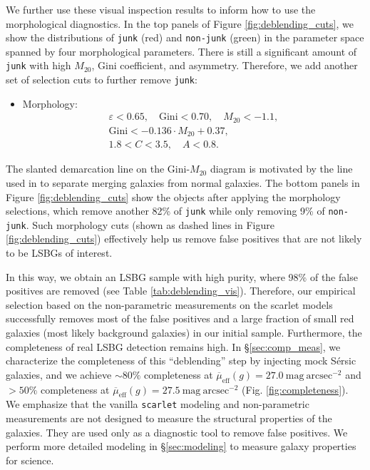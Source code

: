 \documentclass[twocolumn,astrosymb,twocolappendix]{aastex631}
\newcommand{\sbunit}{\mathrm{mag\ arcsec}^{-2}}
\newcommand{\sbeff}{\overline{\mu}_{\mathrm{eff}}(g)}
\newcommand{\code}[1]{\texttt{#1}}
\newcommand{\sersic}{S\'ersic}
\begin{document}
\begin{CJK*}{UTF8}{gbsn}
We further use these visual inspection results to inform how to use the morphological diagnostics. In the top panels of Figure \ref{fig:deblending_cuts}, we show the distributions of \code{junk} (red) and \code{non-junk} (green) in the parameter space spanned by four morphological parameters. There is still a significant amount of \code{junk} with high $M_{20}$, Gini coefficient, and asymmetry. Therefore, we add another set of selection cuts to further remove \code{junk}:
\begin{itemize}
    \item Morphology: 
    \begin{gather*}
        \varepsilon < 0.65,\quad \mathrm{Gini} < 0.70,\quad M_{20} < -1.1,\\
        \mathrm{Gini} < -0.136\cdot M_{20} + 0.37,\\
        1.8 < C < 3.5,\quad A < 0.8.
    \end{gather*}
\end{itemize}
The slanted demarcation line on the Gini-$M_{20}$ diagram is motivated by the line used in \citet{Lotz2008} to separate merging galaxies from normal galaxies. The bottom panels in Figure \ref{fig:deblending_cuts} show the objects after applying the morphology selections, which remove another 82\% of \code{junk} while only removing 9\% of \code{non-junk}. Such morphology cuts (shown as dashed lines in Figure \ref{fig:deblending_cuts}) effectively help us remove false positives that are not likely to be LSBGs of interest. 

In this way, we obtain an LSBG sample with high purity, where 98\% of the false positives are removed (see Table \ref{tab:deblending_vis}). Therefore, our empirical selection based on the non-parametric measurements on the scarlet models successfully removes most of the false positives and a large fraction of small red galaxies (most likely background galaxies) in our initial sample. Furthermore, the completeness of real LSBG detection remains high. In \S\ref{sec:comp_meas}, we characterize the completeness of this ``deblending'' step by injecting mock \sersic{} galaxies, and we achieve $\sim80\%$ completeness at $\sbeff = 27.0\ \sbunit$ and $>50\%$ completeness at $\sbeff = 27.5\ \sbunit$ (Fig. \ref{fig:completeness}). We emphasize that the vanilla \code{scarlet} modeling and non-parametric measurements are not designed to measure the structural properties of the galaxies. They are used only as a diagnostic tool to remove false positives. We perform more detailed modeling in \S\ref{sec:modeling} to measure galaxy properties for science. 


\end{CJK*}
\end{document}
